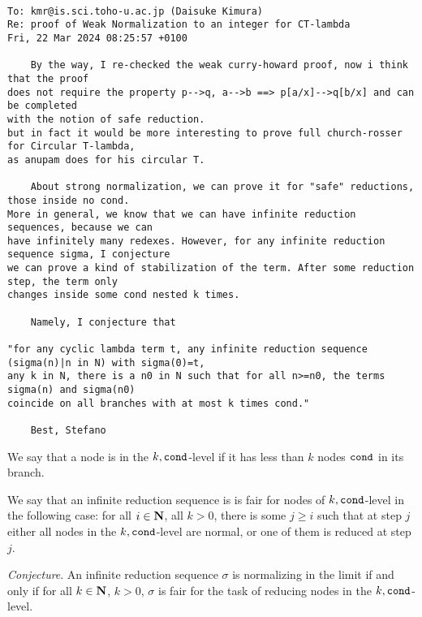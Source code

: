 \documentclass{article}
\begin{document}
\begin{verbatim}

To: kmr@is.sci.toho-u.ac.jp (Daisuke Kimura)
Re: proof of Weak Normalization to an integer for CT-lambda
Fri, 22 Mar 2024 08:25:57 +0100 

    By the way, I re-checked the weak curry-howard proof, now i think that the proof 
does not require the property p-->q, a-->b ==> p[a/x]-->q[b/x] and can be completed 
with the notion of safe reduction.
but in fact it would be more interesting to prove full church-rosser for Circular T-lambda, 
as anupam does for his circular T.

    About strong normalization, we can prove it for "safe" reductions, those inside no cond. 
More in general, we know that we can have infinite reduction sequences, because we can 
have infinitely many redexes. However, for any infinite reduction sequence sigma, I conjecture 
we can prove a kind of stabilization of the term. After some reduction step, the term only 
changes inside some cond nested k times. 

    Namely, I conjecture that

"for any cyclic lambda term t, any infinite reduction sequence (sigma(n)|n in N) with sigma(0)=t, 
any k in N, there is a n0 in N such that for all n>=n0, the terms sigma(n) and sigma(n0)  
coincide on all branches with at most k times cond."

    Best, Stefano

\end{verbatim}


We say that a node is in the $k,{\tt cond}$-level if it has less than $k$ nodes ${\tt cond}$ in its branch.

We say that an infinite reduction sequence is is fair for nodes of $k,{\tt cond}$-level in the following case:
for all $i\in {\bf N}$, all $k>0$, there is some  $j \ge i$ such that at step $j$ either all nodes in the 
$k,{\tt cond}$-level are normal, or one of them is reduced at step $j$.

\emph{Conjecture}. An infinite reduction sequence $\sigma$ 
is normalizing in the limit if and only if for all $k \in {\bf N}$,
$k > 0$, $\sigma$ is fair for the task of reducing nodes in the $k,{\tt cond}$-level.
\end{document}

